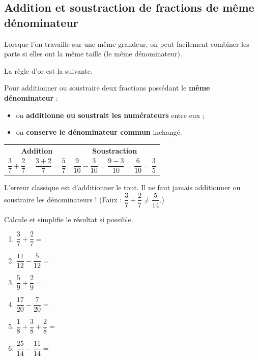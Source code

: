 \documentclass[../../syllabus_1.tex]{subfiles}
\begin{document}
\begin{itemize}
\newpage
\subsection{Addition et soustraction de fractions de même dénominateur}
 
Lorsque l'on travaille sur une même grandeur, on peut facilement combiner les parts si elles ont la même taille (le même dénominateur).
 
La règle d'or est la suivante.

Pour additionner ou soustraire deux fractions possédant le \textbf{même dénominateur} :
\begin{itemize}
    \item on \textbf{additionne ou soustrait les numérateurs} entre eux ;
    \item on \textbf{conserve le dénominateur commun} inchangé.
\end{itemize}
 
\begin{center}
    \begin{tabular}{cc}
        \textbf{Addition} & \textbf{Soustraction} \\[0.5cm]
        $\dfrac{3}{7} + \dfrac{2}{7} = \dfrac{3+2}{7} = \dfrac{5}{7}$ &
        $\dfrac{9}{10} - \dfrac{3}{10} = \dfrac{9-3}{10} = \dfrac{6}{10} = \dfrac{3}{5}$ \\
    \end{tabular}
\end{center}
 
L'erreur classique est d'additionner le tout. Il ne faut jamais additionner ou soustraire les dénominateurs ! (Faux : $\dfrac{3}{7}+\dfrac{2}{7} \neq \dfrac{5}{14}$.)
 
\begin{exercise}
    Calcule et simplifie le résultat si possible.
    \begin{enumerate}[cols=2, itemsep=1.5cm]
        \item $\dfrac{3}{7} + \dfrac{2}{7} = $
        \item $\dfrac{11}{12} - \dfrac{5}{12} = $
        \item $\dfrac{5}{9} + \dfrac{2}{9} = $
        \item $\dfrac{17}{20} - \dfrac{7}{20} = $
        \item $\dfrac{1}{8} + \dfrac{3}{8} + \dfrac{2}{8} = $
        \item $\dfrac{25}{14} - \dfrac{11}{14} = $
    \end{enumerate}
\end{exercise}
 

\end{itemize}
\end{document}
